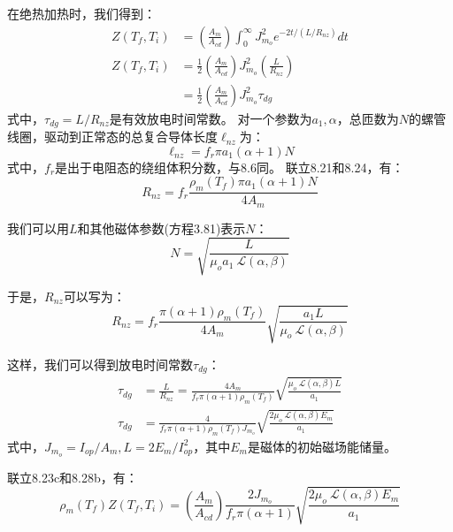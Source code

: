 在绝热加热时，我们得到：
\begin{subequations}%
	\begin{align}
Z(T_f,T_i)&=\left(\frac{A_m}{A_{cd}}\right)\int_{0}^{\infty}J_{m_o}^{2}e^{-2t/(L/R_{nz})}dt\\
Z(T_f,T_i)&=\frac{1}{2}\left(\frac{A_m}{A_{cd}}\right)J_{m_o}^{2}\left(\frac{L}{R_{nz}}\right) \\
&=\frac{1}{2}\left(\frac{A_m}{A_{cd}}\right)J_{m_o}^{2}\tau_{dg}
\end{align}
\end{subequations}
式中，$\tau_{dg}=L/R_{nz}$是有效放电时间常数。
对一个参数为$a_1,\alpha$，总匝数为$N$的螺管线圈，驱动到正常态的总复合导体长度$\ell_{nz}$为：
\begin{equation}%
\ell_{nz}=f_r\pi a_1(\alpha+1)N
\end{equation}
式中，$f_r$是出于电阻态的绕组体积分数，与8.6同。
联立8.21和8.24，有：
\begin{equation}%
R_{nz}=f_r\frac{\rho_m(T_f)\pi a_1(\alpha+1)N}{4A_m}
\end{equation}

我们可以用$L$和其他磁体参数(方程3.81)表示$N$：
\begin{equation}%
N=\sqrt{\frac{L}{\mu_oa_1\ \mathcal{L}(\alpha,\beta)}}
\end{equation}

于是，$R_{nz}$可以写为：
\begin{equation}%
R_{nz}=f_r\frac{\pi(\alpha+1)\rho_m(T_f)}{4A_m}\sqrt{\frac{a_1L}{\mu_o\ \mathcal{L}(\alpha,\beta)}}
\end{equation}

这样，我们可以得到放电时间常数$\tau_{dg}$：
\begin{subequations}%
	\begin{align}
\tau_{dg}&=\frac{L}{R_{nz}}=\frac{4A_m}{f_r\pi(\alpha+1)\rho_m(T_f)}\sqrt{\frac{\mu_o\ \mathcal{L}(\alpha,\beta)L}{a_1}}\\
\tau_{dg}&=\frac{4}{f_r\pi(\alpha+1)\rho_m(T_f)J_{m_o}}\sqrt{\frac{2\mu_o\ \mathcal{L}(\alpha,\beta)E_m}{a_1}}
\end{align}
\end{subequations}
式中，$J_{m_o}=I_{op}/A_m, L=2E_m/I_{op}^2$，其中$E_m$是磁体的初始磁场能储量。

联立8.23c和8.28b，有：
\begin{equation}%
\rho_m(T_f)Z(T_f,T_i)=\left(\frac{A_m}{A_{cd}}\right)\frac{2J_{m_o}}{f_r\pi(\alpha+1)}\sqrt{\frac{2\mu_o\ \mathcal{L}(\alpha,\beta)E_m}{a_1}}
\end{equation}

